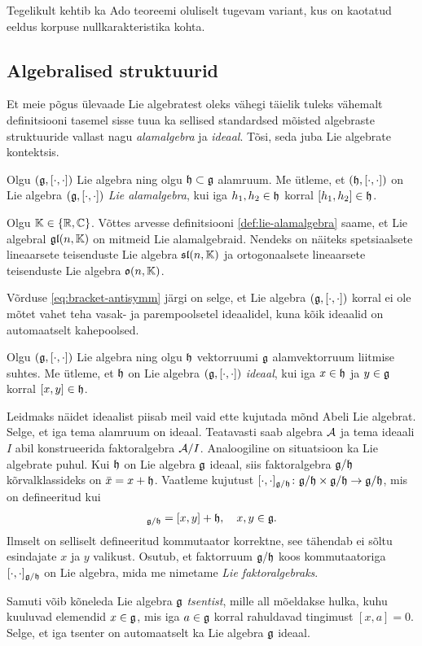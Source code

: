 Tegelikult kehtib ka Ado teoreemi oluliselt tugevam variant,
kus on kaotatud eeldus korpuse nullkarakteristika
kohta.\cite{hochschild1966}

\subsection{Algebralised struktuurid}\label{subsec:algebralised-struktuurid}

Et meie põgus ülevaade Lie algebratest oleks vähegi täielik tuleks vähemalt
definitsiooni tasemel sisse tuua ka sellised standardsed mõisted algebraste
struktuuride vallast nagu \emph{alamalgebra} ja \emph{ideaal}. Tõsi, seda
juba Lie algebrate kontektsis.

\begin{dfn}\label{def:lie-alamalgebra}
    Olgu $(\mathfrak{g}, [\cdot, \cdot])$ Lie algebra ning olgu $\mathfrak{h} \subset \mathfrak{g}$ alamruum.
    Me ütleme, et $(\mathfrak{h}, [\cdot, \cdot])$ on Lie algebra $(\mathfrak{g}, [\cdot, \cdot])$
    \emph{Lie alamalgebra}, kui iga $h_1, h_2 \in \mathfrak{h}$ korral $[h_1, h_2] \in \mathfrak{h}$.
\end{dfn}

Olgu $\mathbb{K} \in \{\mathbb{R}, \mathbb{C}\}$. Võttes arvesse definitsiooni \ref{def:lie-alamalgebra}
saame, et Lie algebral $\mathfrak{gl}(n, \mathbb{K})$ on mitmeid Lie alamalgebraid. Nendeks on
näiteks spetsiaalsete lineaarsete teisenduste Lie algebra $\mathfrak{sl}(n, \mathbb{K})$
ja ortogonaalsete lineaarsete teisenduste Lie algebra $\mathfrak{o}(n, \mathbb{K})$.

Võrduse \eqref{eq:bracket-antisymm} järgi on selge, et Lie algebra
$(\mathfrak{g}, [\cdot, \cdot])$ korral ei ole mõtet vahet teha vasak- ja
parempoolsetel ideaalidel, kuna kõik ideaalid on automaatselt kahepoolsed.

\begin{dfn}
    Olgu $(\mathfrak{g}, [\cdot, \cdot])$ Lie algebra ning olgu $\mathfrak{h}$ vektorruumi $\mathfrak{g}$
    alamvektorruum liitmise suhtes. Me ütleme, et $\mathfrak{h}$ on Lie algebra
    $(\mathfrak{g}, [\cdot, \cdot])$ \emph{ideaal}, kui iga $x \in \mathfrak{h}$ ja $y \in \mathfrak{g}$ korral
    $[x, y] \in \mathfrak{h}$.
\end{dfn}

Leidmaks näidet ideaalist piisab meil vaid ette kujutada mõnd Abeli
Lie algebrat. Selge, et iga tema alamruum on ideaal. Teatavasti saab
algebra $\mathcal{A}$ ja tema ideaali $I$ abil konstrueerida faktoralgebra
$\mathcal{A} / I$. Analoogiline
on situatsioon ka Lie algebrate puhul. Kui $\mathfrak{h}$ on Lie algebra $\mathfrak{g}$ ideaal,
siis faktoralgebra $\mathfrak{g} / \mathfrak{h}$ kõrvalklassideks on $\bar{x} = x + \mathfrak{h}$.
Vaatleme kujutust
$[\cdot, \cdot]_{\mathfrak{g} / \mathfrak{h}} \colon \mathfrak{g} / \mathfrak{h} \times \mathfrak{g} / \mathfrak{h} \to \mathfrak{g} / \mathfrak{h}$,
mis on defineeritud kui
\begin{align*}
    [x+\h, y+\h]_{\g / \h} = [x, y] + \h, \quad x, y \in \g.
\end{align*}
Ilmselt on selliselt defineeritud kommutaator korrektne, see tähendab ei sõltu
esindajate $x$ ja $y$ valikust. Osutub, et faktorruum $\mathfrak{g} / \mathfrak{h}$ koos
kommutaatoriga $[\cdot, \cdot]_{\mathfrak{g} / \mathfrak{h}}$ on Lie algebra, mida me
nimetame \emph{Lie faktoralgebraks}.

Samuti võib kõneleda Lie algebra $\mathfrak{g}$ \emph{tsentist}, mille all mõeldakse
hulka, kuhu kuuluvad elemendid $x \in \mathfrak{g}$, mis iga $a \in \mathfrak{g}$ korral rahuldavad
tingimust $[x, a] = 0$. Selge, et iga tsenter on automaatselt ka Lie algebra
$\mathfrak{g}$ ideaal.
